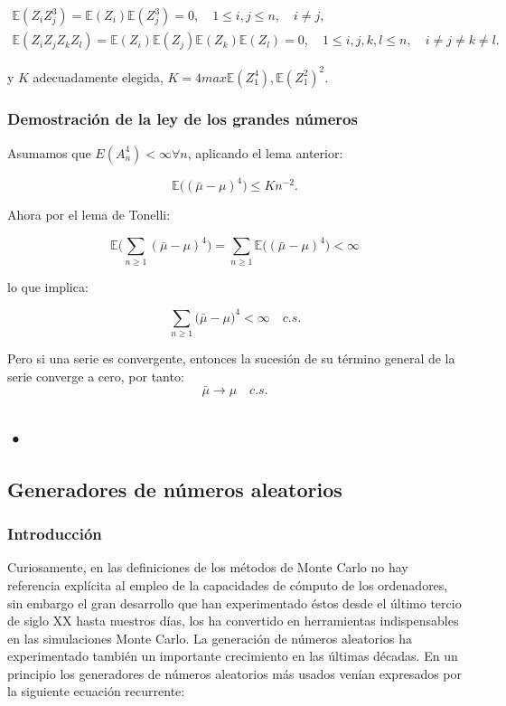 \documentclass[../proyecto.tex]{memoir}
\begin{document}
\begin{align*}
	\mathds{E} (Z_{i} Z_{j}^3 ) =\mathds{E} (Z_{i}) \mathds{E} (Z_{j}^3) = 0, \quad 1 \leq i,j \leq n, \quad i \neq j, \\
	\mathds{E} ( Z_{i} Z_{j} Z_{k} Z_{l} ) = \mathds{E} (Z_{i}) \mathds{E} (Z_{j}) \mathds{E} (Z_{k}) \mathds{E} (Z_{l}) = 0, \quad 1 \leq i,j,k,l \leq n, \quad i \neq j \neq k \neq l.
\end{align*}

y $K$ adecuadamente elegida, $K = 4 max{\mathds{E}(Z_1^4), \mathds{E}(Z_1^2)^2}$.

\subsubsection{Demostración de la ley de los grandes números}

Asumamos que $E(A_n^4) < \infty \forall n$, aplicando el lema anterior:

$$
	\mathds{E} \big( ( \bar{ \mu } - \mu ) ^ 4 \big) \leq K n^{-2}.
$$

Ahora por el lema de Tonelli:

$$
	\mathds{E} \big( \sum_{n \geq 1}( \bar{ \mu } - \mu ) ^ 4 \big) = \sum_{n \geq 1} \mathds{E} \big( ( \bar{ \mu } - \mu ) ^ 4 \big)  < \infty
$$

lo que implica:

$$
\sum_{n \geq 1} \big( \bar{ \mu } - \mu \big)^ 4 < \infty \quad c.s. 
$$

Pero si una serie es convergente, entonces la sucesión de su término general de la serie converge a cero, por tanto:
$$
 \bar{ \mu } \to \mu \quad c.s.
$$
% 

\subsection{•}


\subsection{Generadores de números aleatorios}

\subsubsection{Introducción}

Curiosamente, en las definiciones de los métodos de Monte Carlo no hay referencia explícita al empleo de la capacidades de cómputo de los ordenadores, sin embargo el gran desarrollo que han experimentado éstos desde el último tercio de siglo XX hasta nuestros días, los ha convertido en herramientas indispensables en las simulaciones Monte Carlo. La generación de números aleatorios ha experimentado también un importante crecimiento en las últimas décadas. En un principio los generadores de números aleatorios  más usados venían expresados por la siguiente ecuación recurrente:
\end{document}
